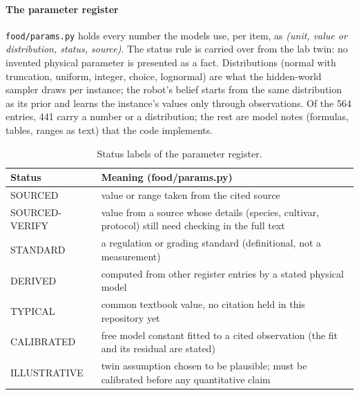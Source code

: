 \documentclass[10.5pt,a4paper]{article}
\begin{document}
\paragraph{The parameter register} \texttt{food/params.py} holds every number the models use, per item, as
\emph{(unit, value or distribution, status, source)}. The status rule is carried over from the lab twin: no invented
physical parameter is presented as a fact. Distributions (normal with truncation, uniform, integer, choice, lognormal)
are what the hidden-world sampler draws per instance; the robot's belief starts from the same distribution as its
prior and learns the instance's values only through observations. Of the 564 entries, 441 carry a number or a distribution; the rest are model notes (formulas, tables, ranges as
text) that the code implements.
\begin{table}[htbp]\centering\footnotesize\caption{Status labels of the parameter register.}
\begin{tabularx}{\linewidth}{@{}lX@{}}\toprule Status & Meaning (food/params.py) \\\midrule
SOURCED & value or range taken from the cited source \\
SOURCED-VERIFY & value from a source whose details (species, cultivar, protocol) still need checking in the full text \\
STANDARD & a regulation or grading standard (definitional, not a measurement) \\
DERIVED & computed from other register entries by a stated physical model \\
TYPICAL & common textbook value, no citation held in this repository yet \\
CALIBRATED & free model constant fitted to a cited observation (the fit and its residual are stated) \\
ILLUSTRATIVE & twin assumption chosen to be plausible; must be calibrated before any quantitative claim \\\bottomrule\end{tabularx}\end{table}
\end{document}
